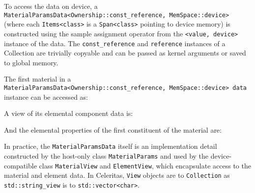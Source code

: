 To access the data on device, a
\texttt{MaterialParamsData\textless{}Ownership::const\_reference,\ MemSpace::device\textgreater{}}
(where each \texttt{Items\textless{}class\textgreater{}} is a
\texttt{Span\textless{}class\textgreater{}} pointing to device memory)
is constructed using the sample assignment operator from the
\texttt{\textless{}value,\ device\textgreater{}} instance of the data.
The \texttt{const\_reference} and \texttt{reference} instances of a
Collection are trivially copyable and can be passed as kernel arguments
or saved to global memory.

The first material in a
\texttt{MaterialParamsData\textless{}Ownership::const\_reference,\ MemSpace::device\textgreater{}\ data}
instance can be accessed as:

\begin{Shaded}
\begin{Highlighting}[]
\NormalTok{ Material\& m = data.materials[ItemId\textless{}Material\textgreater{}(}\NormalTok{)];}
\end{Highlighting}
\end{Shaded}

A view of its elemental component data is:

\begin{Shaded}
\begin{Highlighting}[]
\end{Highlighting}
\end{Shaded}

And the elemental properties of the first constituent of the material
are:

\begin{Shaded}
\begin{Highlighting}[]
\end{Highlighting}
\end{Shaded}

In practice, the \texttt{MaterialParamsData} itself is an implementation
detail constructed by the host-only class \texttt{MaterialParams} and
used by the device-compatible class \texttt{MaterialView} and
\texttt{ElementView}, which encapsulate access to the material and
element data. In Celeritas, \texttt{View} objects are to
\texttt{Collection} as \texttt{std::string\_view} is to
\texttt{std::vector\textless{}char\textgreater{}}.

